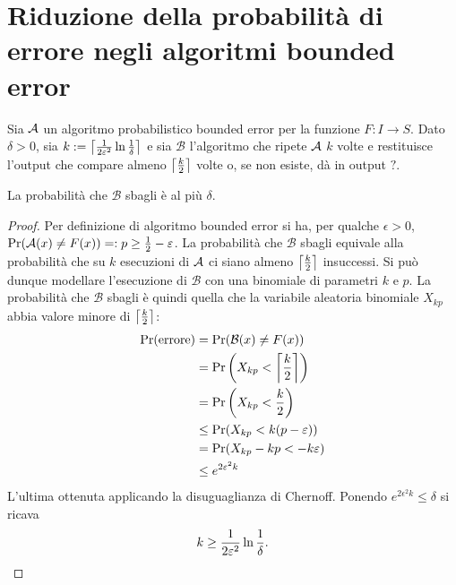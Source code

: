 \section{Riduzione della probabilità di errore negli algoritmi bounded error}
\newcommand{\Balg}{\mathcal B}

Sia $\Aalg$ un algoritmo probabilistico bounded error per la funzione $F:I\to S$.
Dato $\delta>0$, sia $k:=\ceil{\frac{1}{2\epsilon^2}\ln\frac{1}{\delta}}$ e sia $\Balg$ l'algoritmo che ripete $\Aalg$ $k$ volte e restituisce l'output che compare almeno $\ceil{\frac k2}$ volte o, se non esiste, dà in output $?$.

\begin{thm}
	La probabilità che $\Balg$ sbagli è al più $\delta$.
\end{thm}
\begin{proof}
	Per definizione di algoritmo bounded error si ha, per qualche $\epsilon>0$, $\Pr(\Aalg(x)\ne F(x))=:p\ge\frac 12-\epsilon$.
	La probabilità che $\Balg$ sbagli equivale alla probabilità che su $k$ esecuzioni di $\Aalg$ ci siano almeno $\ceil{\frac k2}$ insuccessi.
	Si può dunque modellare l'esecuzione di $\Balg$ con una binomiale di parametri $k$ e $p$. La probabilità che $\Balg$ sbagli è quindi quella che la variabile aleatoria binomiale $X_{kp}$ abbia valore minore di $\ceil{\frac k2}$:
	\begin{align*}
		\Pr(\text{errore}) & = \Pr(\Balg(x)\ne F(x))                  \\
		                   & = \Pr\left(X_{kp}<\ceil{\frac k2}\right) \\
		                   & = \Pr\left(X_{kp}<\frac k2\right)        \\
		                   & \le \Pr(X_{kp}<k(p-\epsilon))            \\
		                   & = \Pr(X_{kp}-kp<-k\epsilon)              \\
		                   & \le e^{2\epsilon^2 k}
	\end{align*}
	L'ultima ottenuta applicando la disuguaglianza di Chernoff. Ponendo $e^{2\epsilon^2 k}\le\delta$ si ricava
	\begin{equation*}
		k\ge\frac{1}{2\epsilon^2}\ln\frac{1}{\delta} \text. \qedhere
	\end{equation*}
\end{proof}
